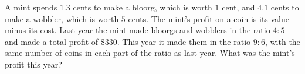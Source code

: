 A mint spends $1.3$ cents to make a bloorg, which is worth $1$ cent, and $4.1$ cents to make a wobbler, which is worth $5$ cents. The mint's profit on a coin is its value minus its cost. Last year the mint made bloorgs and wobblers in the ratio $4:5$ and made a total profit of $\$330$. This year it made them in the ratio $9:6$, with the same number of coins in each part of the ratio as last year. What was the mint's profit this year?
